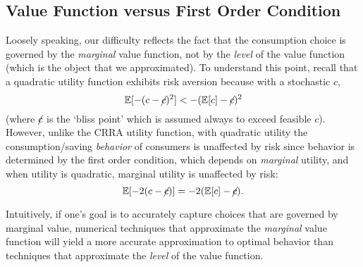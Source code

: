 \documentclass[SolvingMicroDSOPs]{subfiles}
\begin{document}
\hypertarget{value-function-versus-first-order-condition}{}
\subsection{Value Function versus First Order Condition}\label{subsec:vVsuP}

Loosely speaking, our difficulty reflects the fact that the
consumption choice is governed by the \textit{marginal} value function,
not by the \textit{level} of the value function (which is the object that
we approximated).  To understand this point, recall that a quadratic
utility function
 exhibits
risk aversion because with a stochastic ${c}$,
\begin{equation}
  \operatorname{\mathbb{E}}[-({c} - \cancel{c})^{2}] < - (\operatorname{\mathbb{E}}[{c}] - \cancel{c})^{2}
\end{equation}
(where $\cancel{c}$ is the `bliss point' which is assumed always to exceed feasible ${c}$). However, unlike the CRRA utility function,
with quadratic utility the consumption/saving \textit{behavior} of consumers
is unaffected by risk since behavior is determined by the first order condition, which
depends on \textit{marginal} utility, and when utility is quadratic, marginal utility is unaffected
by risk:
\begin{equation}
  \operatorname{\mathbb{E}}[-2({c} - \cancel{c})] = - 2(\operatorname{\mathbb{E}}[{c}] - \cancel{c}).
\end{equation}

Intuitively, if one's goal is to accurately capture choices
that are governed by marginal value,
numerical techniques that approximate the \textit{marginal} value
function will yield a more accurate approximation to
optimal behavior than techniques that approximate the \textit{level}
of the value function.
\end{document}
